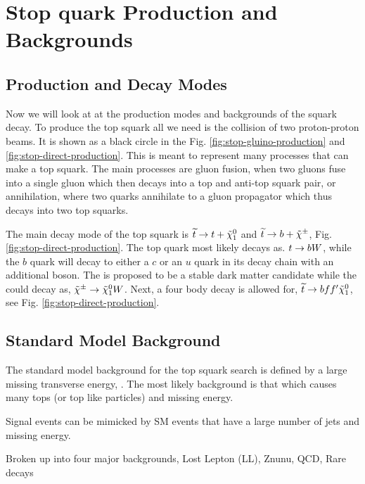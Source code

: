 \chapter{Stop quark Production and Backgrounds}
\label{ch:Search}

\section{Production and Decay Modes}
\label{sec:Production}

Now we will look at at the production modes and backgrounds of the \st{} squark decay. To produce the top squark all we need is the collision of two proton-proton beams. It is shown as a black circle in the Fig. \ref{fig:stop-gluino-production} and \ref{fig:stop-direct-production}. This is meant to represent many processes that can make a top squark. The main processes are gluon fusion, when two gluons fuse into a single gluon which then decays into a top and anti-top squark pair, or annihilation, where two quarks annihilate to a gluon propagator which thus decays into two top squarks. 



The main decay mode of the top squark is $\widetilde{t}\rightarrow t+\tilde{\chi}^{0}_{1}$ and $\widetilde{t}\rightarrow b+\tilde{\chi}^{\pm}$, Fig. \ref{fig:stop-direct-production}. The top quark most likely decays as. $t\rightarrow bW$, while the $b$ quark will decay to either a $c$ or an $u$ quark in its decay chain with an additional \W{} boson. The \neutralino{} is proposed to be a stable dark matter candidate while the \chargino could decay as, $\tilde{\chi}^{\pm}\rightarrow\tilde{\chi}^{0}_{1}W$. Next, a four body decay is allowed for, $\widetilde{t}\rightarrow b f f^\prime \tilde{\chi}^{0}_{1}$, see Fig. \ref{fig:stop-direct-production}.

\section{Standard Model Background}
\label{sec:SMBackground}

The standard model background for the top squark search is defined by a large missing transverse energy, \met{}. The most likely background is that which causes many tops (or top like particles) and missing energy. 

Signal events can be mimicked by SM events that have a large number of jets and missing energy. 

Broken up into four major backgrounds, Lost Lepton (LL), Znunu, QCD, Rare decays

